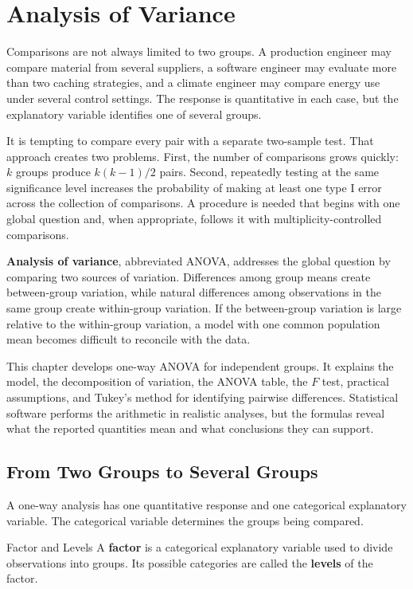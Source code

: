 \chapter{Analysis of Variance}
\label{ch:anova}

Comparisons are not always limited to two groups. A production engineer may compare material from several suppliers, a software engineer may evaluate more than two caching strategies, and a climate engineer may compare energy use under several control settings. The response is quantitative in each case, but the explanatory variable identifies one of several groups.

It is tempting to compare every pair with a separate two-sample test. That approach creates two problems. First, the number of comparisons grows quickly: $k$ groups produce $k(k-1)/2$ pairs. Second, repeatedly testing at the same significance level increases the probability of making at least one type I error across the collection of comparisons. A procedure is needed that begins with one global question and, when appropriate, follows it with multiplicity-controlled comparisons.

\textbf{Analysis of variance}, abbreviated ANOVA, addresses the global question by comparing two sources of variation. Differences among group means create between-group variation, while natural differences among observations in the same group create within-group variation. If the between-group variation is large relative to the within-group variation, a model with one common population mean becomes difficult to reconcile with the data.

This chapter develops one-way ANOVA for independent groups. It explains the model, the decomposition of variation, the ANOVA table, the $F$ test, practical assumptions, and Tukey's method for identifying pairwise differences. Statistical software performs the arithmetic in realistic analyses, but the formulas reveal what the reported quantities mean and what conclusions they can support.

\section{From Two Groups to Several Groups}
\label{sec:anova-several-groups}

A one-way analysis has one quantitative response and one categorical explanatory variable. The categorical variable determines the groups being compared.

\begin{definition}{Factor and Levels}
A \textbf{factor} is a categorical explanatory variable used to divide observations into groups. Its possible categories are called the \textbf{levels} of the factor.
\end{definition}

